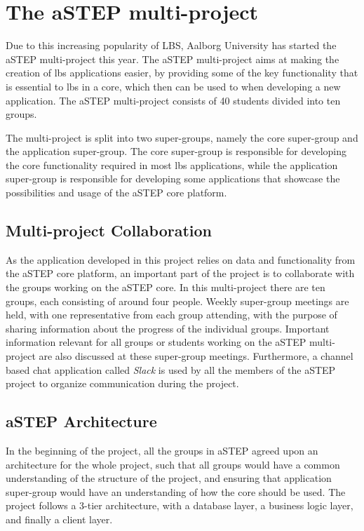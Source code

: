 \section{The aSTEP multi-project} \label{sec:astep}
Due to this increasing popularity of LBS, Aalborg University has started the aSTEP multi-project this year. The aSTEP multi-project aims at making the creation of \gls{lbs} applications easier, by providing some of the key functionality that is essential to \gls{lbs} in a core, which then can be used to when developing a new application. The aSTEP multi-project consists of 40 students divided into ten groups. 

The multi-project is split into two super-groups, namely the core super-group and the application super-group. The core super-group is responsible for developing the core functionality required in most \gls{lbs} applications, while the application super-group is responsible for developing some applications that showcase the possibilities and usage of the aSTEP core platform.



\subsection{Multi-project Collaboration}

As the application developed in this project relies on data and functionality from the aSTEP core platform, an important part of the project is to collaborate with the groups working on the aSTEP core. In this multi-project there are ten groups, each consisting of around four people. Weekly super-group meetings are held, with one representative from each group attending, with the purpose of sharing information about the progress of the individual groups. Important information relevant for all groups or students working on the aSTEP multi-project are also discussed at these super-group meetings. Furthermore, a channel based chat application called \emph{Slack} is used by all the members of the aSTEP project to organize communication during the project.

\subsection{aSTEP Architecture}
In the beginning of the project, all the groups in aSTEP agreed upon an architecture for the whole project, such that all groups would have a common understanding of the structure of the project,  and ensuring that application super-group would have an understanding of how the core should be used. The project follows a 3-tier architecture, with a database layer, a business logic layer, and finally a client layer. 

